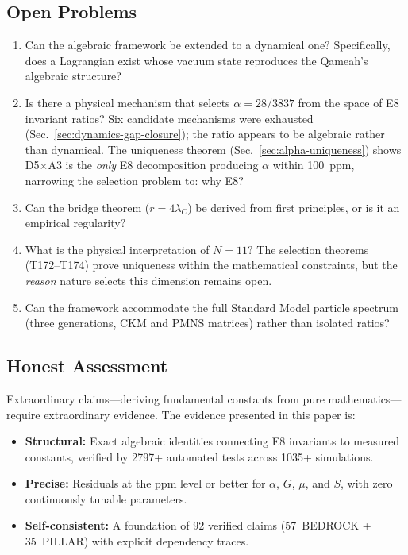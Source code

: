 \documentclass[aps,prd,twocolumn,superscriptaddress,floatfix,nofootinbib]{revtex4-2}
\theoremstyle{definition}
\theoremstyle{remark}
\begin{document}
\subsection{Open Problems}

\begin{enumerate}
\item Can the algebraic framework be extended to a dynamical one?
      Specifically, does a Lagrangian exist whose vacuum state
      reproduces the Qameah's algebraic structure?

\item Is there a physical mechanism that selects
      $\alpha = 28/3837$ from the space of E8 invariant ratios?
      Six candidate mechanisms were exhausted
      (Sec.~\ref{sec:dynamics-gap-closure}); the ratio appears to be
      algebraic rather than dynamical.  The uniqueness theorem
      (Sec.~\ref{sec:alpha-uniqueness}) shows D5$\times$A3 is the
      \emph{only} E8 decomposition producing $\alpha$ within 100~ppm,
      narrowing the selection problem to: why E8?

\item Can the bridge theorem ($r = 4\lambda_C$) be derived from
      first principles, or is it an empirical regularity?

\item What is the physical interpretation of $N{=}11$?  The
      selection theorems (T172--T174) prove uniqueness within the
      mathematical constraints, but the \emph{reason} nature selects
      this dimension remains open.

\item Can the framework accommodate the full Standard Model particle
      spectrum (three generations, CKM and PMNS matrices) rather than
      isolated ratios?
\end{enumerate}

\subsection{Honest Assessment}

Extraordinary claims---deriving fundamental constants from pure
mathematics---require extraordinary evidence.  The evidence presented
in this paper is:

\begin{itemize}
\item \textbf{Structural:} Exact algebraic identities connecting E8
      invariants to measured constants, verified by 2797+ automated
      tests across 1035+ simulations.

\item \textbf{Precise:} Residuals at the ppm level or better for
      $\alpha$, $G$, $\mu$, and $S$, with zero continuously tunable
      parameters.

\item \textbf{Self-consistent:} A foundation of 92 verified claims
      (57~BEDROCK + 35~PILLAR) with explicit dependency traces.
\end{itemize}
\end{document}
